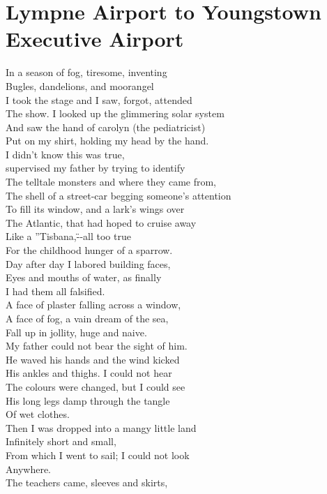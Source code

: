 \documentclass[smalldemyvopaper,11pt,twoside,onecolumn,openright,extrafontsizes]{memoir}
\newlength\drop
\begin{document}
\chapter{Lympne Airport to Youngstown Executive Airport}
In a season of fog, tiresome, inventing
\\Bugles, dandelions, and moorangel
\\I took the stage and I saw, forgot, attended
\\The show. I looked up the glimmering solar system
\\And saw the hand of carolyn (the pediatricist)
\\Put on my shirt, holding my head by the hand.
\\I didn't know this was true,
\\supervised my father by trying to identify
\\The telltale monsters and where they came from,
\\The shell of a street-car begging someone's attention
\\To fill its window, and a lark's wings over
\\The Atlantic, that had hoped to cruise away
\\Like a ''Tisbana,\"--all too true
\\For the childhood hunger of a sparrow.
\\Day after day I labored building faces,
\\Eyes and mouths of water, as finally
\\I had them all falsified.
\\A face of plaster falling across a window,
\\A face of fog, a vain dream of the sea,
\\Fall up in jollity, huge and naive.
\\My father could not bear the sight of him.
\\He waved his hands and the wind kicked
\\His ankles and thighs. I could not hear
\\The colours were changed, but I could see
\\His long legs damp through the tangle
\\Of wet clothes.
\\Then I was dropped into a mangy little land
\\Infinitely short and small,
\\From which I went to sail; I could not look
\\Anywhere.
\\The teachers came, sleeves and skirts,
\end{document}
